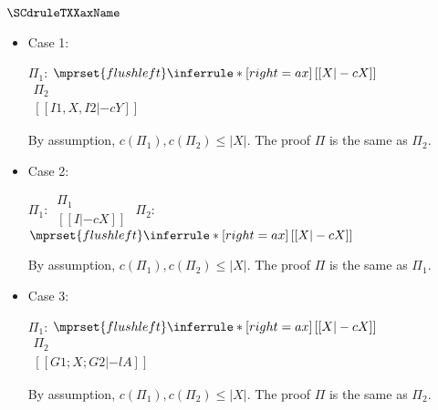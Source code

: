 \subsubsection{$\SCdruleTXXaxName$}
\begin{itemize}
\item Case 1:
      \begin{center}
        \scriptsize
        $\Pi_1$:
        \begin{math}
          $$\mprset{flushleft}
          \inferrule* [right={\tiny ax}] {
            \,
          }{[[X |-c X]]}
        \end{math}
        \qquad\qquad
        \begin{math}
          \begin{array}{c}
            \Pi_2 \\
            {[[I1, X, I2 |-c Y]]}
          \end{array}
        \end{math}
      \end{center}
      By assumption, $c(\Pi_1),c(\Pi_2)\leq |X|$. The proof $\Pi$ is the
      same as $\Pi_2$.

\item Case 2:
      \begin{center}
        \scriptsize
        $\Pi_1$:
        \begin{math}
          \begin{array}{c}
            \Pi_1 \\
            {[[I |-c X]]}
          \end{array}
        \end{math}
        \qquad\qquad
        $\Pi_2$:
        \begin{math}
          $$\mprset{flushleft}
          \inferrule* [right={\tiny ax}] {
            \,
          }{[[X |-c X]]}
        \end{math}
      \end{center}
      By assumption, $c(\Pi_1),c(\Pi_2)\leq |X|$. The proof $\Pi$ is the
      same as $\Pi_1$.

\item Case 3:
      \begin{center}
        \scriptsize
        $\Pi_1$:
        \begin{math}
          $$\mprset{flushleft}
          \inferrule* [right={\tiny ax}] {
            \,
          }{[[X |-c X]]}
        \end{math}
        \qquad\qquad
        \begin{math}
          \begin{array}{c}
            \Pi_2 \\
            {[[G1; X; G2 |-l A]]}
          \end{array}
        \end{math}
      \end{center}
      By assumption, $c(\Pi_1),c(\Pi_2)\leq |X|$. The proof $\Pi$ is the
      same as $\Pi_2$.
\end{itemize}

